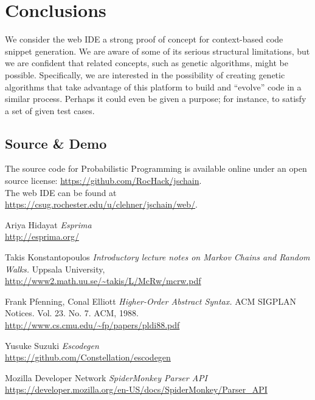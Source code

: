 \documentclass{article}
\begin{document}
\section{Conclusions}

We consider the web IDE a strong proof of concept for context-based code snippet generation. We are aware of some of its serious structural limitations, but we are confident that related concepts, such as genetic algorithms, might be possible. Specifically, we are interested in the possibility of creating genetic algorithms that take advantage of this platform to build and ``evolve'' code in a similar process. Perhaps it could even be given a purpose; for instance, to satisfy a set of given test cases.


\subsection*{Source \& Demo}

The source code for Probabilistic Programming is available online under an open
source license:
\url{https://github.com/RocHack/jschain}.\\

\noindent The web IDE can be found at
\url{https://csug.rochester.edu/u/clehner/jschain/web/}.

\clearpage

\begin{thebibliography}{1}

	 Ariya Hidayat {\em Esprima}
		\\\url{http://esprima.org/}

	 Takis Konstantopoulos {\em Introductory lecture notes on
		Markov Chains and Random Walks.} Uppsala University,
		\\\url{http://www2.math.uu.se/~takis/L/McRw/mcrw.pdf}

	 Frank Pfenning, Conal Elliott
		{\em Higher-Order Abstract Syntax.}
		ACM SIGPLAN Notices. Vol. 23. No. 7. ACM, 1988.
		\\\url{http://www.cs.cmu.edu/~fp/papers/pldi88.pdf}

	 Yusuke Suzuki {\em Escodegen}
		\\\url{https://github.com/Constellation/escodegen}

	 Mozilla Developer Network {\em SpiderMonkey Parser API}
		\\\url{https://developer.mozilla.org/en-US/docs/SpiderMonkey/Parser_API}

\end{thebibliography}
\end{document}
